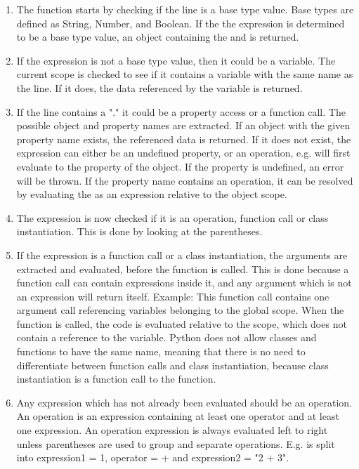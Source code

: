 \begin{enumerate}
    \item The function starts by checking if the line is a base type value. Base types are defined as String, Number, and Boolean. If the the expression is determined to be a base type value, an object containing the  and  is returned. 
    \item If the expression is not a base type value, then it could be a variable. The current scope is checked to see if it contains a variable with the same name as the line. If it does, the data referenced by the variable is returned.
    \item If the line contains a "." it could be a property access or a function call. The possible object and property names are extracted. If an object with the given property name exists, the referenced data is returned. If it does not exist, the expression can either be an undefined property, or an operation, e.g.  will first evaluate to the property  of the  object. If the property is undefined, an error will be thrown. If the property name contains an operation, it can be resolved by evaluating the  as an expression relative to the object scope.
    \item The expression is now checked if it is an operation, function call or class instantiation. This is done by looking at the parentheses.
    \item If the expression is a function call or a class instantiation, the arguments are extracted and evaluated, before the function is called. This is done because a function call can contain expressions inside it, and any argument which is not an expression will return itself. Example: This  function call contains one argument call referencing variables belonging to the global scope. When the function is called, the code is evaluated relative to the  scope, which does not contain a reference to the  variable. Python does not allow classes and functions to have the same name, meaning that there is no need to differentiate between function calls and class instantiation, because class instantiation is a function call to the  function.
    \item Any expression which has not already been evaluated should be an operation. An operation is an expression containing at least one operator and at least one expression. An operation expression is always evaluated left to right unless parentheses are used to group and separate operations. E.g.  is split into expression1 = 1, operator = + and expression2 = "2 + 3".
\end{enumerate}
